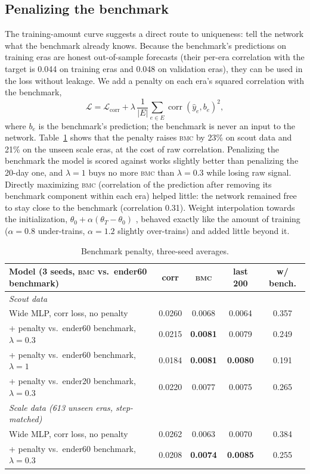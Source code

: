\documentclass[11pt]{article}
\newcommand{\bmc}{\textsc{bmc}}
\begin{document}
\subsection{Penalizing the benchmark}

The training-amount curve suggests a direct route to uniqueness: tell the network what the
benchmark already knows. Because the benchmark's predictions on training eras are honest
out-of-sample forecasts (their per-era correlation with the target is 0.044 on training eras
and 0.048 on validation eras), they can be used in the loss without leakage. We add a penalty
on each era's squared correlation with the benchmark,
\begin{equation}
  \mathcal{L} = \mathcal{L}_{\text{corr}} + \lambda\,\frac{1}{|E|}\sum_{e\in E}
  \operatorname{corr}(\hat y_e, b_e)^2,
\end{equation}
where $b_e$ is the benchmark's prediction; the benchmark is never an input to the network.
Table~\ref{tab:penalty} shows that the penalty raises \bmc{} by 23\% on scout data and 21\% on the
unseen scale eras, at the cost of raw correlation. Penalizing the benchmark the model is scored
against works slightly better than penalizing the 20-day one, and $\lambda=1$ buys no more
\bmc{} than $\lambda=0.3$ while losing raw signal. Directly maximizing \bmc{} (correlation of the
prediction after removing its benchmark component within each era) helped little: the network
remained free to stay close to the benchmark (correlation 0.31). Weight interpolation towards
the initialization, $\theta_0 + \alpha(\theta_T-\theta_0)$ \citep{ali2019continuous}, behaved
exactly like the amount of training ($\alpha=0.8$ under-trains, $\alpha=1.2$ slightly
over-trains) and added little beyond it.

\begin{table}[t]
\centering\small
\begin{tabular}{p{6.2cm}cccc}
\toprule
Model (3 seeds, \bmc{} vs.\ ender60 benchmark) & corr & \bmc{} & last 200 & w/ bench. \\
\midrule
\emph{Scout data} & & & & \\
Wide MLP, corr loss, no penalty & 0.0260 & 0.0068 & 0.0064 & 0.357 \\
+ penalty vs.\ ender60 benchmark, $\lambda=0.3$ & 0.0215 & \textbf{0.0081} & 0.0079 & 0.249 \\
+ penalty vs.\ ender60 benchmark, $\lambda=1$ & 0.0184 & \textbf{0.0081} & \textbf{0.0080} & 0.191 \\
+ penalty vs.\ ender20 benchmark, $\lambda=0.3$ & 0.0220 & 0.0077 & 0.0075 & 0.265 \\
\midrule
\emph{Scale data (613 unseen eras, step-matched)} & & & & \\
Wide MLP, corr loss, no penalty & 0.0262 & 0.0063 & 0.0070 & 0.384 \\
+ penalty vs.\ ender60 benchmark, $\lambda=0.3$ & 0.0208 & \textbf{0.0074} & \textbf{0.0085} & 0.255 \\
\bottomrule
\end{tabular}
\caption{Benchmark penalty, three-seed averages.}
\label{tab:penalty}
\end{table}
\end{document}
